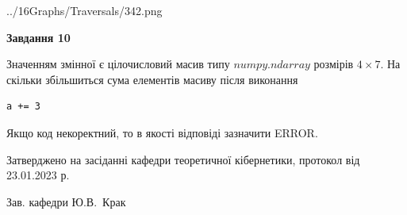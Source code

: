 \documentclass[12pt, ukrainian]{article}
\begin{document}
{\begin {large}
\begin{center}
	{../16Graphs/Traversals/342.png}
\end{center}\par
\newpage

{\begin {center}\textbf{Завдання 10}\end {center}}\par
Значенням змінної  є цілочисловий масив типу $numpy.ndarray$ розмірів $4{\times}7$. На скільки збільшиться сума елементів масиву  після виконання
\begin{verbatim}
a += 3
\end{verbatim}


Якщо код некоректний, то в якості відповіді зазначити ERROR.\par
\newpage


\end {large}
}
{\smallskip \begin {small} Затверджено на засіданні кафедри теоретичної кібернетики, протокол  від   23.01.2023 р.\par\smallskip\smallskip
{\parbox {6.5 cm}{Зав. кафедри \dotfill Ю.В.~Крак}} \end{small}}
\end{document}

